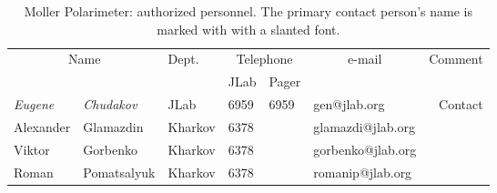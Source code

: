 \begin{table}[ht]
\begin{center}
\begin{tabular}{|ll|l|l|l|l|r|} \hline
  \multicolumn{2}{|c|}{Name} & Dept. & \multicolumn{2}{c|}{Telephone} & 
  \multicolumn{1}{c|}{e-mail} & Comment \\ 
  \cline{4-5}
   &  &   & JLab & Pager &  & \\ 
\hline
%
 {\em Eugene} & {\em Chudakov}  & JLab    & 6959 & 6959 & gen@jlab.org      & Contact     \\ 
 Alexander    & Glamazdin       & Kharkov & 6378 &      & glamazdi@jlab.org &  \\ 
 Viktor       & Gorbenko        & Kharkov & 6378 &      & gorbenko@jlab.org &  \\ 
 Roman        & Pomatsalyuk     & Kharkov & 6378 &      & romanip@jlab.org  &  \\ 
\hline
\end{tabular}
\end{center}
\caption{Moller Polarimeter: authorized personnel. The primary contact person's
 name is marked with with a slanted font. 
}
\label{tab:moller:personnel}
\end{table}
%
